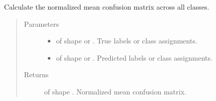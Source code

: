 \documentclass[letterpaper,10pt,english]{sphinxmanual}
\begin{document}
\begin{fulllineitems}
\label{\detokenize{pusion.evaluation.evaluation_metrics:pusion.evaluation.evaluation_metrics.mean_multilabel_confusion_matrix}}
\sphinxAtStartPar
Calculate the normalized mean confusion matrix across all classes.
\begin{quote}\begin{description}
\item[{Parameters}] \leavevmode\begin{itemize}
\item {} 
\sphinxAtStartPar
{} \textendash{}  of shape  or . True labels or class assignments.

\item {} 
\sphinxAtStartPar
{} \textendash{}  of shape  or . Predicted labels or
class assignments.

\end{itemize}

\item[{Returns}] \leavevmode
\sphinxAtStartPar
{} of shape . Normalized mean confusion matrix.

\end{description}\end{quote}

\end{fulllineitems}

\end{document}
